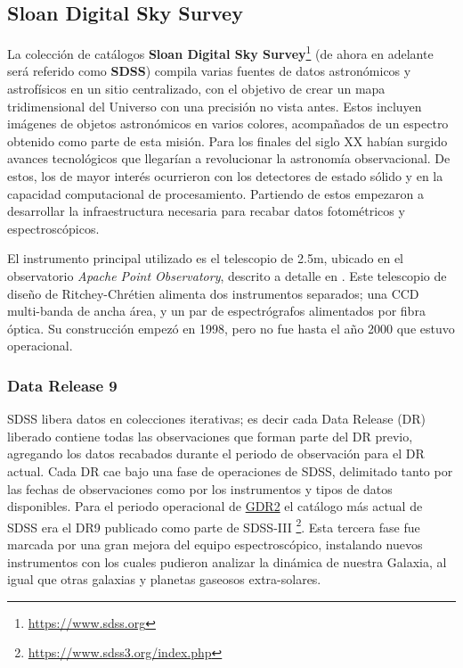 \subsection{Sloan Digital Sky Survey}

La colección de catálogos \textbf{Sloan Digital Sky
Survey}\footnote{\url{https://www.sdss.org}} (de ahora en adelante será referido
como \textbf{SDSS}) compila varias fuentes de datos astronómicos y astrofísicos
en un sitio centralizado, con el objetivo de crear un mapa tridimensional del
Universo con una precisión no vista antes. Estos incluyen imágenes de objetos
astronómicos en varios colores, acompañados de un espectro obtenido como parte
de esta misión. Para los finales del siglo XX habían surgido avances
tecnológicos que llegarían a revolucionar la astronomía observacional. De estos,
los de mayor interés ocurrieron con los detectores de estado sólido y en la
capacidad computacional de procesamiento. Partiendo de estos empezaron a
desarrollar la infraestructura necesaria para recabar datos fotométricos y
espectroscópicos.

El instrumento principal utilizado es el telescopio de 2.5m, ubicado en el
observatorio \textit{Apache Point Observatory}, descrito a detalle en
\citet*{sdss2_5mTelescope}. Este telescopio de diseño de Ritchey-Chrétien
alimenta dos instrumentos separados; una CCD multi-banda de ancha área, y un par
de espectrógrafos alimentados por fibra óptica. Su construcción empezó en 1998,
pero no fue hasta el año 2000 que estuvo operacional.

\subsubsection{Data Release 9}

SDSS libera datos en colecciones iterativas; es decir cada Data Release (DR)
liberado contiene todas las observaciones que forman parte del DR previo,
agregando los datos recabados durante el periodo de observación para el DR
actual. Cada DR cae bajo una fase de operaciones de SDSS, delimitado tanto por
las fechas de observaciones como por los instrumentos y tipos de datos
disponibles. Para el periodo operacional de
\hyperref[muestra:sec:gaia:dr2]{GDR2} el catálogo más actual de SDSS era el DR9
publicado como parte de SDSS-III
\footnote{\url{https://www.sdss3.org/index.php}}. Esta tercera fase fue marcada
por una gran mejora del equipo espectroscópico, instalando nuevos instrumentos
con los cuales pudieron analizar la dinámica de nuestra Galaxia, al igual que
otras galaxias y planetas gaseosos extra-solares. 

